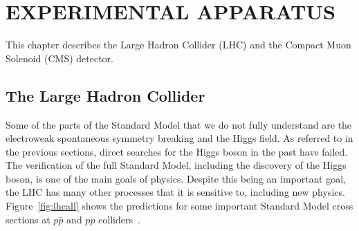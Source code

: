 

\chapter{EXPERIMENTAL APPARATUS}

This chapter describes the Large Hadron Collider (LHC) and the Compact Muon Solenoid (CMS) detector.


\section{The Large Hadron Collider}

Some of the parts of the Standard Model that we do not fully understand are the electroweak spontaneous symmetry breaking and the Higgs field.  As referred to in the previous sections, direct searches for the Higgs boson in the past have failed. The verification of the full Standard Model, including the discovery of the Higgs boson, is one of the main goals of physics.  Despite this being an important goal, the LHC has many other processes that it is sensitive to, including new physics. Figure~\ref{fig:lhcall} shows the predictions for some important Standard Model cross sections at  $p \bar p$ and  $pp$  colliders~\cite{Campbell:2006wx}. 

